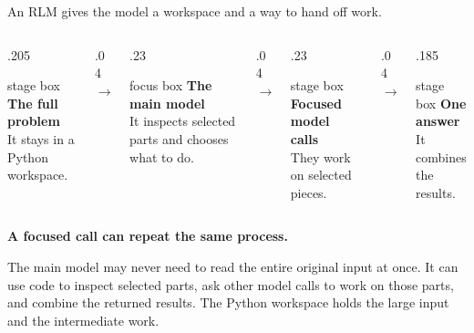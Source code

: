 \documentclass[aspectratio=169,11pt]{beamer}
\newcommand{\rlmstagebox}[1]{%
  \begin{beamercolorbox}[wd=\linewidth,sep=.55em,center,rounded=true]{stage box}
    #1
  \end{beamercolorbox}%
}
\newcommand{\rlmfocusbox}[1]{%
  \begin{beamercolorbox}[wd=\linewidth,sep=.55em,center,rounded=true]{focus box}
    #1
  \end{beamercolorbox}%
}
\begin{document}
\begin{frame}{An RLM gives the model a workspace and a way to hand off work.}
  \begin{columns}[c,onlytextwidth]
    \begin{column}{.205\textwidth}
      \rlmstagebox{\textbf{The full problem}\\[.2em]
        \footnotesize It stays in a Python workspace.}
    \end{column}
    \begin{column}{.04\textwidth}
      \centering\Large\color{RlmTeal}$\rightarrow$
    \end{column}
    \begin{column}{.23\textwidth}
      \rlmfocusbox{\textbf{The main model}\\[.2em]
        \footnotesize It inspects selected parts and chooses what to do.}
    \end{column}
    \begin{column}{.04\textwidth}
      \centering\Large\color{RlmTeal}$\rightarrow$
    \end{column}
    \begin{column}{.23\textwidth}
      \rlmstagebox{\textbf{Focused model calls}\\[.2em]
        \footnotesize They work on selected pieces.}
    \end{column}
    \begin{column}{.04\textwidth}
      \centering\Large\color{RlmTeal}$\rightarrow$
    \end{column}
    \begin{column}{.185\textwidth}
      \rlmstagebox{\textbf{One answer}\\[.2em]
        \footnotesize It combines the results.}
    \end{column}
  \end{columns}

  \vspace{.25cm}
  \centering
  {\small\color{RlmGold}\textbf{A focused call can repeat the same process.}}

  \vspace{0.35cm}
  \begin{block}{The main model may never need to read the entire original input at once.}
    It can use code to inspect selected parts, ask other model calls to work on those parts, and
    combine the returned results. The Python workspace holds the large input and the intermediate
    work.
  \end{block}
\end{frame}
\end{document}
